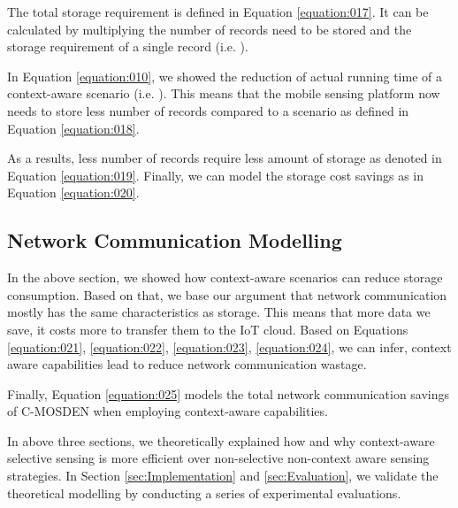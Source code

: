\documentclass[journal]{IEEEtran}
\begin{document}
The total storage requirement is defined in Equation \ref{equation:017}. It can be calculated by multiplying the  number of records need to be stored and the storage requirement of a single record (i.e. ).




In Equation \ref{equation:010}, we showed the reduction of actual running time of a context-aware scenario (i.e. ). This means that the mobile sensing platform now needs to store  less number of records compared to a  scenario as defined in Equation \ref{equation:018}.




As a results, less number of records require less amount of storage as denoted in Equation \ref{equation:019}. Finally, we can model the storage cost savings  as  in Equation \ref{equation:020}.








\subsection{Network Communication Modelling}
\label{sec:Network_Communication}

In the above section, we showed how context-aware  scenarios can reduce storage consumption. Based on that, we base our argument that network communication mostly has the same characteristics as storage. This means that more data we save, it costs more to transfer them to the IoT cloud. Based on Equations \ref{equation:021}, \ref{equation:022}, \ref{equation:023}, \ref{equation:024}, we can infer, context aware capabilities lead to reduce network communication wastage. 

















Finally, Equation \ref{equation:025} models the total network communication savings of C-MOSDEN when employing context-aware capabilities. 




In above three sections, we theoretically explained how and why context-aware selective sensing is more efficient over non-selective non-context aware sensing strategies. In Section \ref{sec:Implementation} and \ref{sec:Evaluation}, we validate the theoretical modelling by conducting a series of experimental evaluations.
\end{document}
